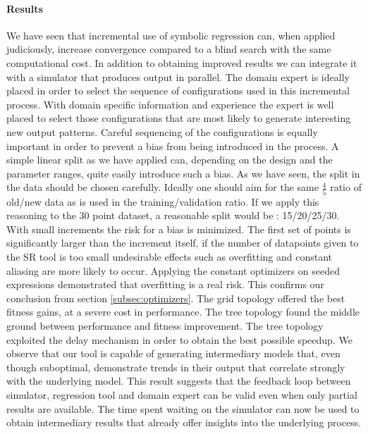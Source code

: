 \paragraph{Results}
We have seen that incremental use of symbolic regression can, when applied judiciously, increase convergence compared to a blind search with the same computational cost. In addition to obtaining improved results we can integrate it with a simulator that produces output in parallel. 
The domain expert is ideally placed in order to select the sequence of configurations used in this incremental process. With domain specific information and experience the expert is well placed to select those configurations that are most likely to generate interesting new output patterns. Careful sequencing of the configurations is equally important in order to prevent a bias from being introduced in the process. A simple linear split as we have applied can, depending on the design and the parameter ranges, quite easily introduce such a bias.
As we have seen, the split in the data should be chosen carefully. Ideally one should aim for the same $\frac{4}{5}$ ratio of old/new data as is used in the training/validation ratio. If we apply this reasoning to the 30 point dataset, a reasonable split would be : 15/20/25/30. With small increments the risk for a bias is minimized. The first set of points is significantly larger than the increment itself, if the number of datapoints given to the SR tool is too small undesirable effects such as overfitting and constant aliasing are more likely to occur.
Applying the constant optimizers on seeded expressions demonstrated that overfitting is a real risk. This confirms our conclusion from section \ref{subsec:optimizers}.
The grid topology offered the best fitness gains, at a severe cost in performance. The tree topology found the middle ground between performance and fitness improvement. The tree topology exploited the delay mechanism in order to obtain the best possible speedup.
We observe that our tool is capable of generating intermediary models that, even though suboptimal, demonstrate trends in their output that correlate strongly with the underlying model. This result suggests that the feedback loop between simulator, regression tool and domain expert can be valid even when only partial results are available. The time spent waiting on the simulator can now be used to obtain intermediary results that already offer insights into the underlying process.

